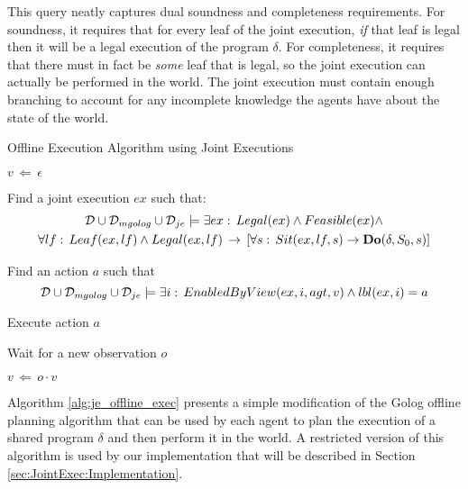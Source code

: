 This query neatly captures dual soundness and completeness requirements.
For soundness, it requires that for every leaf of the joint execution,
\emph{if} that leaf is legal then it will be a legal execution of
the program $\delta$. For completeness, it requires that there must
in fact be \emph{some} leaf that is legal, so the joint execution
can actually be performed in the world. The joint execution must contain
enough branching to account for any incomplete knowledge the agents
have about the state of the world.

%
\begin{algorithm}[t]
\caption{Offline Execution Algorithm using Joint Executions}


\label{alg:je_offline_exec} \begin{algorithmic}

\STATE

\STATE $v\,\Leftarrow\,\epsilon$

\STATE Find a joint execution $ex$ such that:\begin{multline*}
\mathcal{D}\cup\mathcal{D}_{mgolog}\cup\mathcal{D}_{je}\models\exists ex:\, Legal(ex)\wedge Feasible(ex)\wedge\\
\forall lf:\, Leaf(ex,lf)\wedge Legal(ex,lf)\,\rightarrow\,\left[\forall s:\, Sit(ex,lf,s)\rightarrow\mathbf{Do}(\delta,S_{0},s)\right]\end{multline*}



\STATE Find an action $a$ such that\[
\mathcal{D}\cup\mathcal{D}_{mgolog}\cup\mathcal{D}_{je}\models\exists i:\, EnabledByView(ex,i,agt,v)\wedge lbl(ex,i)=a\]



\STATE Execute action $a$

\ENDIF

\STATE Wait for a new observation $o$

\STATE $v\,\Leftarrow\, o\cdot v$

\ENDWHILE

\end{algorithmic} 
\end{algorithm}


Algorithm \ref{alg:je_offline_exec} presents a simple modification
of the Golog offline planning algorithm that can be used by each agent
to plan the execution of a shared program $\delta$ and then perform
it in the world. A restricted version of this algorithm is used by
our implementation that will be described in Section \ref{sec:JointExec:Implementation}.

